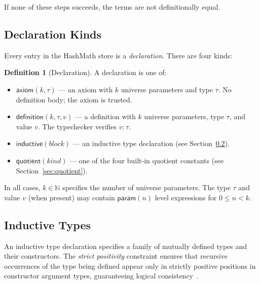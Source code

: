 \documentclass[11pt]{article}
\theoremstyle{definition}
\newtheorem{definition}{Definition}[section]
\theoremstyle{plain}
\theoremstyle{remark}
\begin{document}
If none of these steps succeeds, the terms are not definitionally equal.

\subsection{Declaration Kinds}
\label{sec:declarations}

Every entry in the HashMath store is a \emph{declaration}.
There are four kinds:

\begin{definition}[Declaration]
\label{def:decl}
A declaration is one of:
\begin{itemize}[nosep]
  \item $\textsf{axiom}(k, \tau)$ --- an axiom with $k$ universe parameters and type $\tau$.
        No definition body; the axiom is trusted.
  \item $\textsf{definition}(k, \tau, v)$ --- a definition with $k$ universe parameters, type $\tau$, and value $v$.
        The typechecker verifies $v : \tau$.
  \item $\textsf{inductive}(\mathit{block})$ --- an inductive type declaration (see Section~\ref{sec:inductive}).
  \item $\textsf{quotient}(\mathit{kind})$ --- one of the four built-in quotient constants (see Section~\ref{sec:quotient}).
\end{itemize}
\end{definition}

In all cases, $k \in \mathbb{N}$ specifies the number of universe parameters.
The type $\tau$ and value $v$ (when present) may contain $\textsf{param}(n)$ level
expressions for $0 \leq n < k$.

\subsection{Inductive Types}
\label{sec:inductive}

An inductive type declaration specifies a family of mutually defined types and their constructors.
The \emph{strict positivity} constraint ensures that recursive occurrences of the type being defined
appear only in strictly positive positions in constructor argument types, guaranteeing logical consistency~\cite{paulin1993}.
\end{document}
